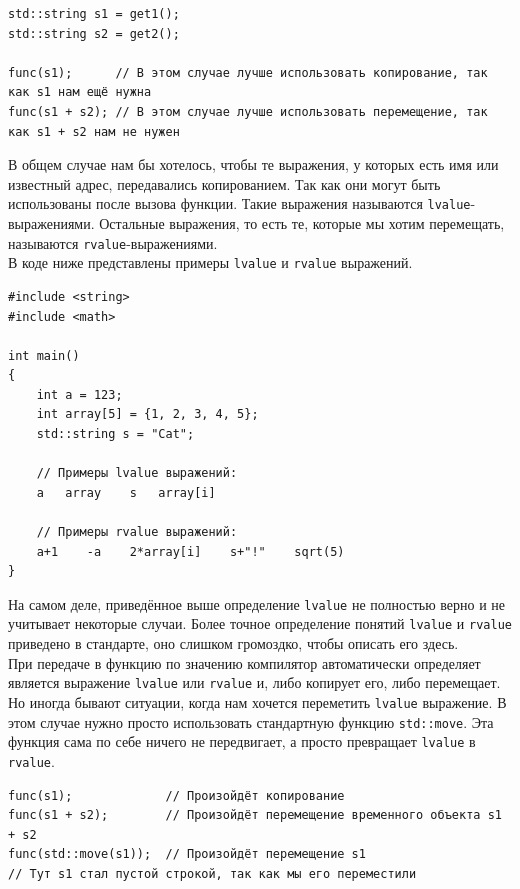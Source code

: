 \documentclass{article}
\begin{document}
\begin{lstlisting}
std::string s1 = get1();
std::string s2 = get2();

func(s1);      // В этом случае лучше использовать копирование, так как s1 нам ещё нужна
func(s1 + s2); // В этом случае лучше использовать перемещение, так как s1 + s2 нам не нужен
\end{lstlisting}
В общем случае нам бы хотелось, чтобы те выражения, у которых есть имя или известный адрес, передавались копированием. Так как они могут быть использованы после вызова функции. Такие выражения называются \texttt{lvalue}-выражениями. Остальные выражения, то есть те, которые мы хотим перемещать, называются \texttt{rvalue}-выражениями.\\



В коде ниже представлены примеры \texttt{lvalue} и \texttt{rvalue} выражений.

\begin{lstlisting}
#include <string>
#include <math>

int main() 
{
    int a = 123;
    int array[5] = {1, 2, 3, 4, 5};
    std::string s = "Cat";
    
    // Примеры lvalue выражений:
    a   array    s   array[i]  
    
    // Примеры rvalue выражений:
    a+1    -a    2*array[i]    s+"!"    sqrt(5)
}
\end{lstlisting}

На самом деле, приведённое выше определение \texttt{lvalue} не полностью верно и не учитывает некоторые случаи. Более точное определение понятий \texttt{lvalue} и \texttt{rvalue} приведено в стандарте, оно слишком громоздко, чтобы описать его здесь.\\

При передаче в функцию по значению компилятор автоматически определяет является выражение \texttt{lvalue} или \texttt{rvalue} и, либо копирует его, либо перемещает. Но иногда бывают ситуации, когда нам хочется переметить \texttt{lvalue} выражение. В этом случае нужно просто использовать стандартную функцию \texttt{std::move}. Эта функция сама по себе ничего не передвигает, а просто превращает \texttt{lvalue} в \texttt{rvalue}.
\begin{lstlisting}
func(s1);             // Произойдёт копирование
func(s1 + s2);        // Произойдёт перемещение временного объекта s1 + s2
func(std::move(s1));  // Произойдёт перемещение s1
// Тут s1 стал пустой строкой, так как мы его переместили
\end{lstlisting}
\end{document}
